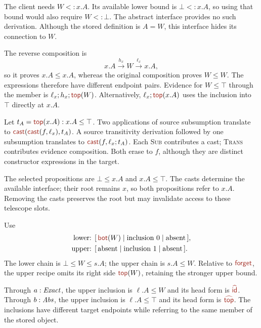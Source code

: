 \label{sec:answers}

The client needs $W<:x.A$. Its available lower bound is $\bot<:x.A$,
so using that bound would also require $W<:\bot$.
The abstract interface provides no such derivation. Although the stored
definition is $A=W$, this interface hides its connection to $W$.

The reverse composition is
\[
 x.A\xrightarrow{h_x}W\xrightarrow{\ell_x}x.A,
\]
so it proves $x.A\le x.A$, whereas the original composition proves
$W\le W$. The expressions therefore have different endpoint pairs.
Evidence for $W\le\top$ through the member is
$\ell_x;h_x;\ev{top}(W)$.
Alternatively, $\ell_x;\ev{top}(x.A)$ uses the inclusion into $\top$
directly at $x.A$.

Let $t_A=\ev{top}(x.A):x.A\le\top$.
Two applications of source subsumption translate to
$\cast{\cast{f}{\ell_x}}{t_A}$.
A source transitivity derivation followed by one subsumption translates to
$\cast{f}{\ell_x;t_A}$.
Each \textsc{Sub} contributes a cast; \textsc{Trans} contributes evidence
composition. Both erase to $f$, although they are distinct constructor
expressions in the target.

The selected propositions are $\bot\le x.A$ and $x.A\le\top$.
The casts determine the available interface; their root remains $x$,
so both propositions refer to $x.A$.
Removing the casts preserves the root but may invalidate access to
these telescope slots.

Use
\[
 \begin{aligned}
 \text{lower: }&
 [\,\ev{bot}(W)\mid\text{inclusion }0\mid\text{absent}\,],\\
 \text{upper: }&
 [\,\text{absent}\mid\text{inclusion }1\mid\text{absent}\,].
 \end{aligned}
\]
The lower chain is $\bot\le W\le s.A$; the upper chain is $s.A\le W$.
Relative to $\ev{forget}$, the upper recipe omits its right side
$\ev{top}(W)$, retaining the stronger upper bound.

Through $a:\mathit{Exact}$, the upper inclusion is $\ell.A\le W$ and its head
form is $\form{id}$. Through $b:\mathit{Abs}$, the upper inclusion is
$\ell.A\le\top$ and its head form is $\form{top}$.
The inclusions have different target endpoints while referring to the
same member of the stored object.

